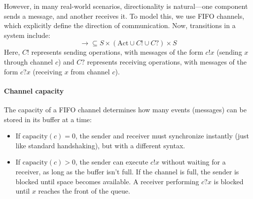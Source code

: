 However, in many real-world scenarios, directionality is natural—one component sends a message, and another receives it. 
To model this, we use FIFO channels, which explicitly define the direction of communication.
Now, transitions in a system include:
\[\rightarrow\subseteq S \times (\text{Act}\cup C! \cup C?) \times S\]
Here, $C!$ represents sending operations, with messages of the form $c!x$ (sending $x$ through channel $c$) and $C?$ represents receiving operations, with messages of the form $c?x$ (receiving $x$ from channel $c$).

\paragraph*{Channel capacity}
The capacity of a FIFO channel determines how many events (messages) can be stored in its buffer at a time: 
\begin{itemize}
    \item If $\text{capacity}(c) = 0$, the sender and receiver must synchronize instantly (just like standard handshaking), but with a different syntax.
    \item If $\text{capacity}(c) > 0$, the sender can execute $c!x$ without waiting for a receiver, as long as the buffer isn't full.
        If the channel is full, the sender is blocked until space becomes available.
        A receiver performing $c?x$ is blocked until $x$ reaches the front of the queue.
\end{itemize}